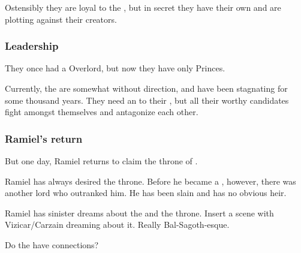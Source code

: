\subsubsection{\Banes}
Ostensibly they are loyal to the \SitraAchra, but in secret they have their own \matrixx{} and are plotting against their creators. 





\subsubsection{Leadership}
They once had a Overlord, but now they have only Princes.

Currently, the \Mystraacht{} are somewhat without direction, and have been stagnating for some thousand years. They need an \apex{} to their \matrixx, but all their worthy candidates fight amongst themselves and antagonize each other. 







\subsubsection{Ramiel's return}
But one day, Ramiel returns to claim the throne of \Mystraacht. 


Ramiel has always desired the \Mystraacht{} throne. 
Before he became a \malach, however, there was another \Mystraacht{} lord who outranked him. 
He has been slain and has no obvious heir. 

Ramiel has sinister dreams about the \Mystraacht{} \matrix{} and the throne. 
Insert a scene with Vizicar/Carzain dreaming about it. 
Really Bal-Sagoth-esque. 


Do the \Mystraacht{} have \ophidian{} connections?















